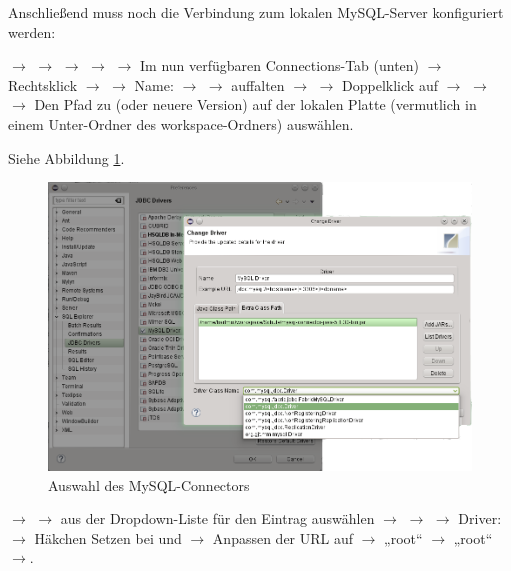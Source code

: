 Anschließend muss noch die Verbindung zum lokalen MySQL-Server konfiguriert
werden:

 $\rightarrow$  $\rightarrow$  $\rightarrow$  $\rightarrow$ 
$\rightarrow$  Im nun verfügbaren Connections-Tab (unten)
$\rightarrow$ Rechtsklick $\rightarrow$ 
$\rightarrow$ Name:  $\rightarrow$  $\rightarrow$  auffalten $\rightarrow$  $\rightarrow$ Doppelklick auf   $\rightarrow$
 $\rightarrow$  $\rightarrow$
Den Pfad zu  (oder neuere Version)
auf der lokalen Platte (vermutlich in einem Unter-Ordner des workspace-Ordners)
auswählen.

Siehe Abbildung \ref{fig:mysql-connector}.

\begin{figure}[h]
  \centering
   \includegraphics[width=1.0\textwidth]{./inf/SEKII/01_Vorbereitung/MySQL-Driver.png}
   \caption{Auswahl des MySQL-Connectors}
   \label{fig:mysql-connector}
\end{figure}

$\rightarrow$  $\rightarrow$ aus der
Dropdown-Liste für  den Eintrag
 auswählen $\rightarrow$ 
$\rightarrow$  $\rightarrow$ Driver: 
$\rightarrow$ Häkchen Setzen bei  und 
$\rightarrow$ Anpassen der URL auf 
$\rightarrow$  „root“ $\rightarrow$  „root“
$\rightarrow$.

